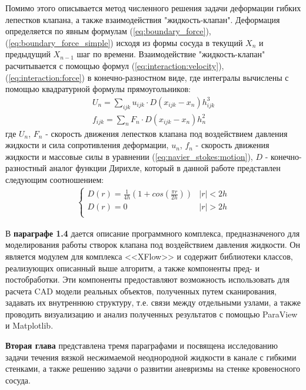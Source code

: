 Помимо этого описывается метод численного решения задачи деформации
гибких лепестков клапана, а также взаимодействия "жидкость-клапан".  Деформация
определяется по явным формулам
(\ref{eq:boundary_force}),(\ref{eq:boundary_force_simple}) исходя из формы
сосуда в текущий $X_{n}$ и предыдущий $X_{n-1}$ шаг по времени.  Взаимодействие
"жидкость-клапан" расчитывается с помощью формул
(\ref{eq:interaction:velocity}), (\ref{eq:interaction:force}) в
конечно-разностном виде, где интегралы вычислены с помощью квадратурной формулы
прямоугольников:
\begin{gather}
    \label{eq:numerical_interpolation}
    U_n = \sum_{ijk}u_{ijk} \cdot D(x_{ijk} - x_n) h_{ijk}^3 \\
    \label{eq:numerical_spreading}
    f_{ijk} = \sum_n F_n \cdot D(x_{ijk} - x_n) h^2_n
\end{gather}
где $U_n$, $F_n$ - скорость движения лепестков клапана под воздействием
давления жидкости и сила сопротивления деформации, $u_n$, $f_n$ - скорость
движения жидкости и массовые силы в уравнении (\ref{eq:navier_stokes:motion}),
$D$ - конечно-разностный аналог функции Дирихле, который в данной работе
представлен следующим соотношением:
\begin{gather}
    \label{eq:numerical_dirichlet}
    \begin{cases}
        D(r) = \frac{1}{4h} (1 + cos(\frac{\pi r}{2h})) & |r| < 2h\\
        D(r) = 0 & |r| > 2h\\
    \end{cases}
\end{gather}

В \textbf{параграфе 1.4} дается описание программного комплекса,
предназначеного для моделирования работы створок клапана под воздействием
давления жидкости. Он является модулем для комплекса <<XFlow>> и содержит
библиотеки классов, реализующих описанный выше алгоритм, а также компоненты
пред- и постобработки. Эти компоненты предоставляют возможность использовать
для расчета CAD модели реальных объектов, полученных путем сканирования,
задавать их внутреннюю структуру, т.е.  связи между отдельными узлами, а также
проводить визуализацию и анализ полученных результатов с помощью ParaView и
Matplotlib.

\textbf{Вторая глава} представлена тремя параграфами и посвящена исследованию
задачи течения вязкой несжимаемой неоднородной жидкости в канале с гибкими
стенками, а также решению задачи о развитии аневризмы на стенке кровеносного
сосуда.

